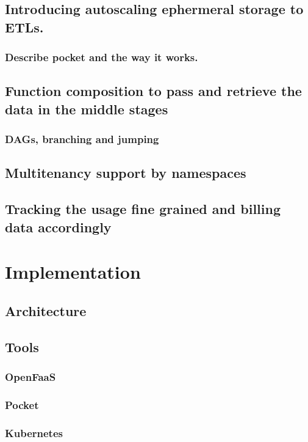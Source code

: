 \documentclass[12pt,titlepage]{article}
\begin{document}
\subsection{Introducing autoscaling ephermeral storage to ETLs.}
\label{sec:org0a7598c}
\subsubsection{Describe pocket and the way it works.}
\label{sec:org48a06b1}
\subsection{Function composition to pass and retrieve the data in the middle stages}
\label{sec:org30c0c13}
\subsubsection{DAGs, branching and jumping}
\label{sec:orgdc104e8}
\subsection{Multitenancy support by namespaces}
\label{sec:orgf507926}
\subsection{Tracking the usage fine grained and billing data accordingly}
\label{sec:org7751bca}
\section{Implementation}
\label{sec:org9878cdc}
\subsection{Architecture}
\label{sec:orgf16283b}
\subsection{Tools}
\label{sec:org43d461e}
\subsubsection{OpenFaaS}
\label{sec:org101ab50}
\subsubsection{Pocket}
\label{sec:org26b3e13}
\subsubsection{Kubernetes}
\label{sec:org7bbb921}
\end{document}
